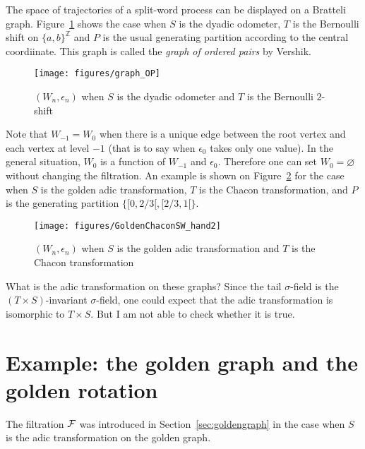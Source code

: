 \documentclass[12pt,a4paper]{article}
\begin{document}
The space of trajectories of a split-word process can be displayed on 
a Bratteli graph. 
Figure~\ref{fig:SW} shows the case when $S$ is the dyadic odometer, 
$T$ is the Bernoulli shift on $\{a,b\}^{\mathbb{Z}}$ and $P$ is the 
usual generating partition according to the central coordiinate. 
This graph is called the \emph{graph of ordered pairs} by Vershik. 

\begin{figure}[!h]
\centering
	\texttt{[image: figures/graph\_OP]}
\caption{$(W_n,\epsilon_n)$ when $S$ is the dyadic odometer and $T$ is the Bernoulli $2$-shift}
\label{fig:SW}
\end{figure}



Note that $W_{-1}=W_0$ when there is a unique edge between the root vertex and each vertex at 
level $-1$ (that is to say when $\epsilon_0$ takes only one value). 
In the general situation,  $W_0$ is a function of $W_{-1}$ and $\epsilon_0$. 
Therefore one can set $W_0=\varnothing$ without changing the filtration. 
An example is shown on Figure~\ref{fig:GoldenChacon} for the case when 
$S$ is the golden adic transformation, $T$ is the Chacon transformation, 
and $P$ is the generating partition $\{[0,2/3[, [2/3, 1[\}$.  

\begin{figure}[!h]
\centering
	\texttt{[image: figures/GoldenChaconSW\_hand2]}
\caption{$(W_n,\epsilon_n)$ when $S$ is the golden adic transformation and $T$ is the Chacon transformation}
\label{fig:GoldenChacon}
\end{figure}

\begin{question}
What is the adic transformation on these graphs? 
Since the tail $\sigma$-field is the $(T\times S)$-invariant $\sigma$-field, 
one could expect that the adic transformation is isomorphic to $T \times S$. 
But I am not able to check whether it is true.  
\end{question}

\section{Example: the golden graph and the golden rotation}

The filtration $\mathcal{F}$ was introduced in Section~\ref{sec:goldengraph}
in the case when $S$ is the adic transformation on the golden graph. 
\end{document}
